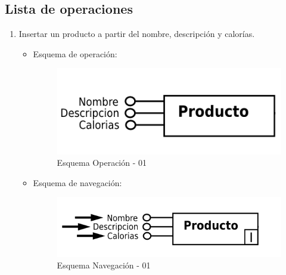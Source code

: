\documentclass[a4paper,12pt]{report}
\begin{document}
\subsection{Lista de operaciones}
\label{sec-7-2-1}
\begin{enumerate}
\item Insertar un producto a partir del nombre, descripción y
calorías.
\begin{itemize}
\item Esquema de operación:
\begin{figure}[!htp]
\centering
\includegraphics[width=0.9\linewidth]{./operaciones/img/Productos/01_ope.png}
\caption{Esquema Operación - 01}
\label{fig:ope01}
\medskip
\footnotesize
{}
\end{figure}
\item Esquema de navegación:
\begin{figure}[!htp]
\centering
\includegraphics[width=0.9\linewidth]{./operaciones/img/Productos/01_nav.png}
\caption{Esquema Navegación - 01}
\label{fig:nave01}
\medskip
\footnotesize
{}
\end{figure}
\end{itemize}


\end{enumerate}
\end{document}

